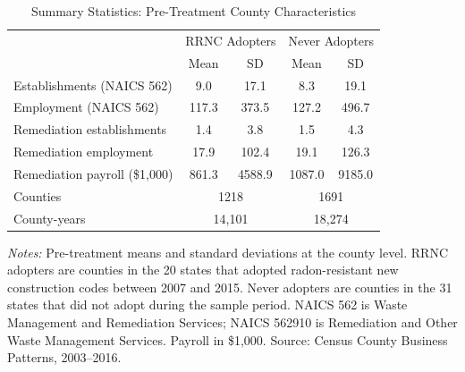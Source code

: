 \begin{table}[htbp]
\centering
\caption{Summary Statistics: Pre-Treatment County Characteristics}
\label{tab:sumstats}
\begin{tabular}{lcccc}
\hline\hline
 & \multicolumn{2}{c}{RRNC Adopters} & \multicolumn{2}{c}{Never Adopters} \\
 & Mean & SD & Mean & SD \\
\hline
Establishments (NAICS 562) & 9.0 & 17.1 & 8.3 & 19.1 \\
Employment (NAICS 562) & 117.3 & 373.5 & 127.2 & 496.7 \\
Remediation establishments & 1.4 & 3.8 & 1.5 & 4.3 \\
Remediation employment & 17.9 & 102.4 & 19.1 & 126.3 \\
Remediation payroll (\$1,000) & 861.3 & 4588.9 & 1087.0 & 9185.0 \\
\hline
Counties & \multicolumn{2}{c}{1218} & \multicolumn{2}{c}{1691} \\
County-years & \multicolumn{2}{c}{14,101} & \multicolumn{2}{c}{18,274} \\
\hline\hline
\end{tabular}
\begin{tablenotes}[flushleft]
\small
\item \textit{Notes:} Pre-treatment means and standard deviations at the county level. RRNC adopters are counties in the 20 states that adopted radon-resistant new construction codes between 2007 and 2015. Never adopters are counties in the 31 states that did not adopt during the sample period. NAICS 562 is Waste Management and Remediation Services; NAICS 562910 is Remediation and Other Waste Management Services. Payroll in \$1,000. Source: Census County Business Patterns, 2003--2016.
\end{tablenotes}
\end{table}

